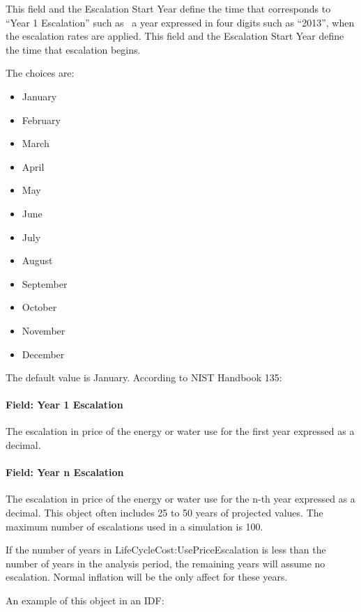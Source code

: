 This field and the Escalation Start Year define the time that corresponds to ``Year 1 Escalation'' such as~ a year expressed in four digits such as ``2013'', when the escalation rates are applied. This field and the Escalation Start Year define the time that escalation begins.

The choices are:

\begin{itemize}
\item
  January
\item
  February
\item
  March
\item
  April
\item
  May
\item
  June
\item
  July
\item
  August
\item
  September
\item
  October
\item
  November
\item
  December
\end{itemize}

The default value is January. According to NIST Handbook 135:

\paragraph{Field: Year 1 Escalation}\label{field-year-1-escalation}

The escalation in price of the energy or water use for the first year expressed as a decimal.

\paragraph{Field: Year n Escalation}\label{field-year-n-escalation}

The escalation in price of the energy or water use for the n-th year expressed as a decimal. This object often includes 25 to 50 years of projected values. The maximum number of escalations used in a simulation is 100.

If the number of years in LifeCycleCost:UsePriceEscalation is less than the number of years in the analysis period, the remaining years will assume no escalation. Normal inflation will be the only affect for these years.

An example of this object in an IDF:

